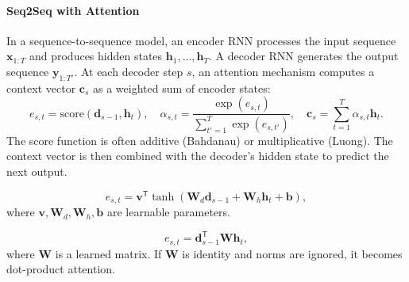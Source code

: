 \documentclass{tufte-handout}
\begin{document}
\paragraph{Seq2Seq with Attention}
In a sequence-to-sequence model, an encoder RNN processes the input sequence $\mathbf{x}_{1:T}$ and produces hidden states $\mathbf{h}_1,\dots,\mathbf{h}_T$. A decoder RNN generates the output sequence $\mathbf{y}_{1:T'}$. At each decoder step $s$, an attention mechanism computes a context vector $\mathbf{c}_s$ as a weighted sum of encoder states:
\[
e_{s,t} = \text{score}(\mathbf{d}_{s-1}, \mathbf{h}_t),\quad
\alpha_{s,t} = \frac{\exp(e_{s,t})}{\sum_{t'=1}^T \exp(e_{s,t'})},\quad
\mathbf{c}_s = \sum_{t=1}^T \alpha_{s,t} \mathbf{h}_t.
\]
The score function is often additive (Bahdanau) or multiplicative (Luong). The context vector is then combined with the decoder’s hidden state to predict the next output.

\begin{defn}
    \[
    e_{s,t} = \mathbf{v}^{\mathsf{T}} \tanh(\mathbf{W}_d \mathbf{d}_{s-1} + \mathbf{W}_h \mathbf{h}_t + \mathbf{b}),
    \]
    where $\mathbf{v}, \mathbf{W}_d, \mathbf{W}_h, \mathbf{b}$ are learnable parameters.
\end{defn}

\begin{defn}
    \[
    e_{s,t} = \mathbf{d}_{s-1}^{\mathsf{T}} \mathbf{W} \mathbf{h}_t,
    \]
    where $\mathbf{W}$ is a learned matrix. If $\mathbf{W}$ is identity and norms are ignored, it becomes dot-product attention.
\end{defn}

\begin{marginfigure}
\centering
{}
\caption{Attention aligns decoder state $\mathbf{d}_{s-1}$ with encoder states $\mathbf{h}_t$ to form a context vector.}
\end{marginfigure}
\end{document}
